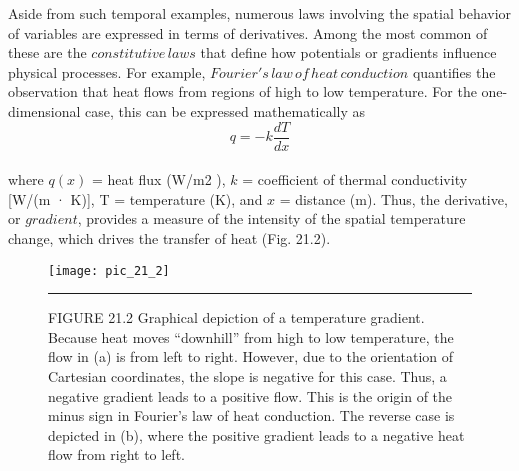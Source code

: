 \documentclass[../main.tex]{subfiles}
\begin{document}
Aside from such temporal examples, numerous laws involving the spatial behavior of
variables are expressed in terms of derivatives. Among the most common of these are the
$constitutive \, laws$ that define how potentials or gradients influence physical processes. For
example, $Fourier's \, law \, of \, heat \, conduction$ quantifies the observation that heat flows from
regions of high to low temperature. For the one-dimensional case, this can be expressed
mathematically as
\begin{equation}
	\tag{21.11}
	q = -k \dfrac{dT}{dx}
\end{equation}\\
where $q (x)$ = heat flux (W/m2
), $k$ = coefficient of thermal conductivity [W/(m · K)], T =
temperature (K), and $x$ = distance (m). Thus, the derivative, or $gradient$, provides a measure
of the intensity of the spatial temperature change, which drives the transfer of heat (Fig. 21.2).
\pagebreak
\begin{figure}[hbt!]
	\centering
	\texttt{[image: pic\_21\_2]}
	\caption{\textsf{FIGURE 21.2
Graphical depiction of a temperature gradient. Because heat moves “downhill” from high to low
temperature, the flow in (a) is from left to right. However, due to the orientation of Cartesian
coordinates, the slope is negative for this case. Thus, a negative gradient leads to a positive
flow. This is the origin of the minus sign in Fourier's law of heat conduction. The reverse case is
depicted in (b), where the positive gradient leads to a negative heat flow from right to left.}} \hrule
	\label{pic.21.2}
\end{figure}\\
\end{document}
